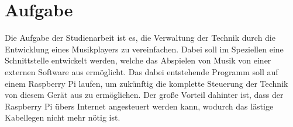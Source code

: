 \section{Aufgabe}
Die Aufgabe der Studienarbeit ist es, die Verwaltung der Technik durch die
Entwicklung eines Musikplayers zu vereinfachen. Dabei soll im Speziellen eine
Schnittstelle entwickelt werden, welche das Abspielen von Musik von einer
externen Software aus ermöglicht. Das dabei entstehende Programm soll auf einem
Raspberry Pi laufen, um zukünftig die komplette Steuerung der Technik von
diesem Gerät aus zu ermöglichen. Der große Vorteil dahinter ist, dass der
Raspberry Pi übers Internet angesteuert werden kann, wodurch das lästige
Kabellegen nicht mehr nötig ist.


